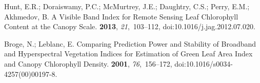 \documentclass[remotesensing,article,accept,moreauthors,pdftex]{Definitions/mdpi}
\begin{document}
\begin{thebibliography}{999}
Hunt, E.R.; Doraiswamy, P.C.; McMurtrey, J.E.; Daughtry, C.S.; Perry, E.M.;
  Akhmedov, B.
\newblock A Visible Band Index for Remote Sensing Leaf Chlorophyll Content at
  the Canopy Scale.
 {\bf 2013}, {\em 21},~103--112, doi:10.1016/j.jag.2012.07.020.

Broge, N.; Leblanc, E.
\newblock Comparing Prediction Power and Stability of Broadband and
  Hyperspectral Vegetation Indices for Estimation of Green Leaf Area Index and
  Canopy Chlorophyll Density.
 {\bf 2001}, {\em 76},~156--172, doi:10.1016/s0034-4257(00)00197-8.

\end{thebibliography}
\end{document}
